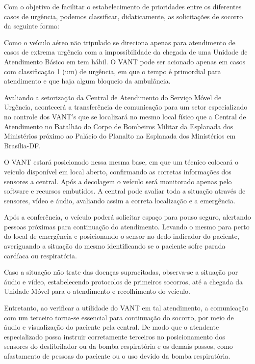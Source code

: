 
Com o objetivo de facilitar o estabelecimento de prioridades entre os diferentes casos de urgência, podemos classificar, didaticamente, as solicitações de socorro da seguinte forma:


Como o veículo aéreo não tripulado se direciona apenas para atendimento de casos de extrema urgência com a impossibilidade da chegada de uma Unidade de Atendimento Básico em tem hábil. O VANT pode ser acionado apenas em casos com classificação 1 (um) de urgência, em que o tempo é primordial para atendimento e que haja algum bloqueio da ambulância.

Avaliando a setorização da Central de Atendimento do Serviço Móvel de Urgência, acontecerá a transferência de comunicação para um setor especializado no controle dos VANT’s que se localizará no mesmo local físico que a Central de Atendimento no Batalhão do Corpo de Bombeiros Militar da Esplanada dos Ministérios próximo ao Palácio do Planalto na Esplanada dos Ministérios em Brasília-DF.

O VANT estará posicionado nessa mesma base, em que um técnico colocará o veículo disponível em local aberto, confirmando as corretas informações dos sensores a central. Após a decolagem o veículo será monitorado apenas pelo software e recursos embutidos. A central pode avaliar toda a situação através de sensores, vídeo e áudio, avaliando assim a correta localização e a emergência. 

Após a conferência, o veículo poderá solicitar espaço para pouso seguro, alertando pessoas próximas para continuação do atendimento. Levando o mesmo para perto do local de emergência e posicionando o sensor no dedo indicador do paciente, averiguando a situação do mesmo identificando se o paciente sofre parada cardíaca ou respiratória.

Caso a situação não trate das doenças supracitadas, observa-se a situação por áudio e vídeo, estabelecendo protocolos de primeiros socorros, até a chegada da Unidade Móvel para o atendimento e recolhimento do veículo.

Entretanto, ao verificar a utilidade do VANT em tal atendimento, a comunicação com um terceiro torna-se essencial para continuação do socorro, por meio de áudio e visualização do paciente pela central. De modo que o atendente especializado possa instruir corretamente terceiros no posicionamento dos sensores do desfibrilador ou da bomba respiratória e os demais passos, como afastamento de pessoas do paciente ou o uso devido da bomba respiratória.


